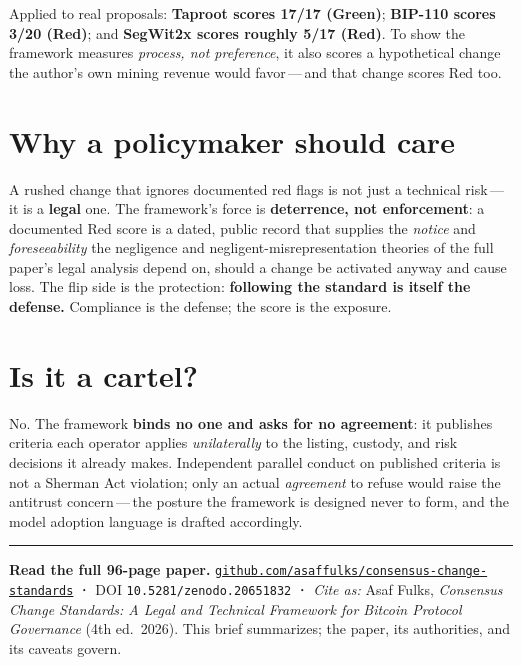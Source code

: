 \documentclass[11pt]{article}
\begin{document}
\vspace{-4pt}
Applied to real proposals: \textbf{Taproot scores 17/17 (Green)}; \textbf{BIP-110 scores 3/20 (Red)}; and \textbf{SegWit2x scores roughly 5/17 (Red)}. To show the framework measures \emph{process, not preference}, it also scores a hypothetical change the author's own mining revenue would favor\,---\,and that change scores Red too.

\section{Why a policymaker should care}
A rushed change that ignores documented red flags is not just a technical risk\,---\,it is a \textbf{legal} one. The framework's force is \textbf{deterrence, not enforcement}: a documented Red score is a dated, public record that supplies the \emph{notice} and \emph{foreseeability} the negligence and negligent-misrepresentation theories of the full paper's legal analysis depend on, should a change be activated anyway and cause loss. The flip side is the protection: \textbf{following the standard is itself the defense.} Compliance is the defense; the score is the exposure.

\section{Is it a cartel?}
No. The framework \textbf{binds no one and asks for no agreement}: it publishes criteria each operator applies \emph{unilaterally} to the listing, custody, and risk decisions it already makes. Independent parallel conduct on published criteria is not a Sherman Act violation; only an actual \emph{agreement} to refuse would raise the antitrust concern\,---\,the posture the framework is designed never to form, and the model adoption language is drafted accordingly.

\vfill
{\color{bitcoinorange}\rule{\linewidth}{0.8pt}}
\vspace{3pt}
{\small\textbf{Read the full 96-page paper.} \href{https://github.com/asaffulks/consensus-change-standards}{\nolinkurl{github.com/asaffulks/consensus-change-standards}} \textbf{·} DOI \texttt{10.5281/zenodo.20651832} \textbf{·} \textit{Cite as:} Asaf Fulks, \textit{Consensus Change Standards: A Legal and Technical Framework for Bitcoin Protocol Governance} (4th ed.~2026). This brief summarizes; the paper, its authorities, and its caveats govern.}
\end{document}
